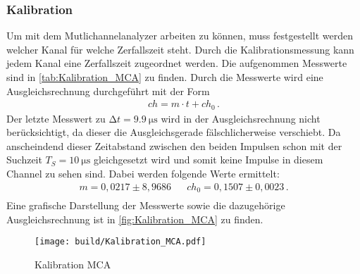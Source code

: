   \subsubsection{Kalibration}
  Um mit dem Mutlichannelanalyzer arbeiten zu können, muss festgestellt werden welcher Kanal für welche Zerfallszeit steht.
  Durch die Kalibrationsmessung kann jedem Kanal eine Zerfallszeit zugeordnet werden.
  Die aufgenommen Messwerte sind in \autoref{tab:Kalibration_MCA} zu finden.
  Durch die Messwerte wird eine Ausgleichsrechnung durchgeführt mit der Form
  \begin{align*}
    ch = m \cdot t + ch_0 \, .
  \end{align*}
  Der letzte Messwert zu $\increment t = \SI{9.9}{\micro\second}$ wird in der Ausgleichsrechnung nicht berücksichtigt, da dieser die Ausgleichsgerade fälschlicherweise verschiebt.
  Da anscheindend dieser Zeitabstand zwischen den beiden Impulsen schon mit der Suchzeit $T_S = \SI{10}{\micro\second}$ gleichgesetzt wird und somit keine Impulse in diesem Channel zu sehen sind.
  Dabei werden folgende Werte ermittelt:
  \begin{align*}
    m = 0,0217 \pm 8,9686 && ch_0 = 0,1507 \pm 0,0023\, . \\ 
  \end{align*}
  Eine grafische Darstellung der Messwerte sowie die dazugehörige Ausgleichsrechnung ist in \autoref{fig:Kalibration_MCA} zu finden.
  \begin{figure}
    \centering
    \texttt{[image: build/Kalibration\_MCA.pdf]}
    \caption{Kalibration MCA}
    \label{fig:Kalibration_MCA}
  \end{figure}
